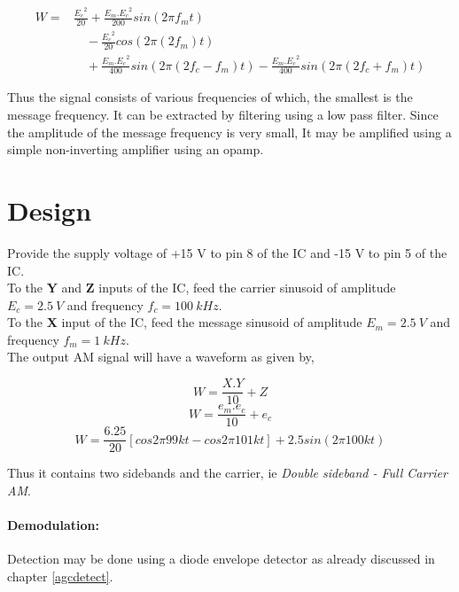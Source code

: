 \begin{equation}
\begin{split}
W=& \frac{{E_c}^2}{20}+\frac{E_m.{E_c}^2}{200}sin(2\pi f_mt) \\
&\quad -\frac{{E_c}^2}{20}cos(2\pi(2f_m)t) \\
&\quad +\frac{E_m.{E_c}^2}{400}sin(2\pi (2f_c-f_m)t)  -  \frac{E_m.{E_c}^2}{400}sin(2\pi (2f_c+f_m)t)
\end{split}
\end{equation}

Thus the signal consists of various frequencies of which, the smallest is the message frequency. It can be extracted by filtering using a low pass filter. Since the amplitude of the message frequency is very small, It may be amplified using a simple non-inverting amplifier using an opamp.

\section*{Design}
Provide the supply voltage of +15 V to pin 8 of the IC and -15 V to pin 5 of the IC.\\

\noindent To the \textbf{Y} and \textbf{Z} inputs of the IC, feed the carrier sinusoid of amplitude $E_c=2.5\ V$ and frequency $f_c= 100\ kHz$.\\
To the \textbf{X} input of the IC, feed the message sinusoid of amplitude $E_m=2.5\ V$ and frequency $f_m= 1\ kHz$.\\

\noindent The output AM signal will have a waveform as given by,

\begin{equation}
W=\frac{X.Y}{10}+Z
\end{equation}
\begin{equation}
W=\frac{e_m.e_c}{10}+e_c
\end{equation}
\begin{equation}
W=\frac{6.25}{20}[cos 2\pi 99kt-cos 2\pi 101kt]+2.5 sin(2\pi100kt)
\end{equation}

\noindent Thus it contains two sidebands and the carrier, ie \emph{Double sideband - Full Carrier AM}.
\paragraph{Demodulation:}
Detection may be done using a diode envelope detector as already discussed in chapter \ref{agcdetect}.


